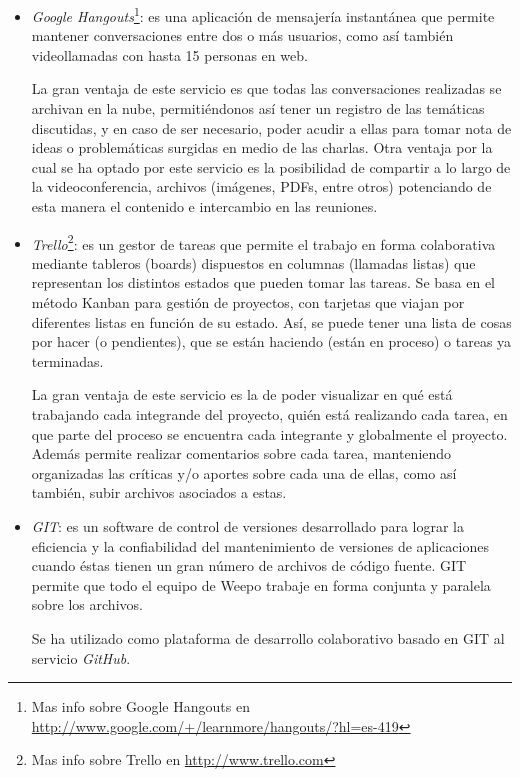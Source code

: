 \documentclass[oneside]{book}
\begin{document}
	\begin{itemize}
	\renewcommand{\labelitemi}{\scriptsize\tiny$\blacksquare$} 
	\itemsep=7pt \topsep=0pt \partopsep=0pt \parskip=0pt \parsep=0pt

		\item \textit{Google Hangouts}\footnote{Mas info sobre Google Hangouts en \url{http://www.google.com/+/learnmore/hangouts/?hl=es-419}}: es una aplicación de mensajería instantánea que permite mantener conversaciones entre dos o más usuarios, como así también videollamadas con hasta 15 personas en web. 
		\par La gran ventaja de este servicio es que todas las conversaciones realizadas se archivan en la nube, permitiéndonos así tener un registro de las temáticas discutidas, y en caso de ser necesario, poder acudir a ellas para tomar nota de ideas o problemáticas surgidas en medio de las charlas. Otra ventaja por la cual se ha optado por este servicio es la posibilidad de compartir a lo largo de la videoconferencia, archivos (imágenes, PDFs, entre otros) potenciando de esta manera el contenido e intercambio en las reuniones.

		\item \textit{Trello}\footnote{Mas info sobre Trello en \url{http://www.trello.com}}: es un gestor de tareas que permite el trabajo en forma colaborativa mediante tableros (boards) dispuestos en columnas (llamadas listas) que representan los distintos estados que pueden tomar las tareas. Se basa en el método Kanban para gestión de proyectos, con tarjetas que viajan por diferentes listas en función de su estado. Así, se puede tener una lista de cosas por hacer (o pendientes), que se están haciendo (están en proceso) o tareas ya terminadas. 
		\par La gran ventaja de este servicio es la de poder visualizar en qué está trabajando cada integrande del proyecto, quién está realizando cada tarea, en que parte del proceso se encuentra cada integrante y globalmente el proyecto. Además permite realizar comentarios sobre cada tarea, manteniendo organizadas las críticas y/o aportes sobre cada una de ellas, como así también, subir archivos asociados a estas.

		\item \textit{GIT}: es un software de control de versiones desarrollado para lograr la eficiencia y la confiabilidad del mantenimiento de versiones de aplicaciones cuando éstas tienen un gran número de archivos de código fuente. GIT permite que todo el equipo de Weepo trabaje en forma conjunta y paralela sobre los archivos.
		\par Se ha utilizado como plataforma de desarrollo colaborativo basado en GIT al servicio \textit{GitHub}.

	\end{itemize}	
\bigskip
\end{document}
